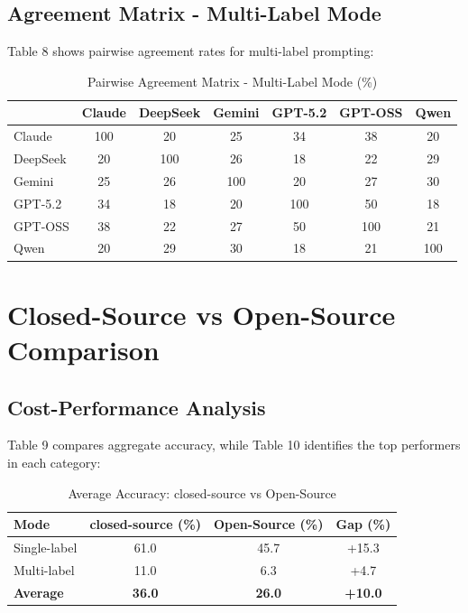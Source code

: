 \documentclass[12pt,a4paper]{article}
\begin{document}
\subsection{Agreement Matrix - Multi-Label Mode}

Table 8 shows pairwise agreement rates for multi-label prompting:

\begin{table}[H]
\centering
\begin{tabular}{lcccccc}
\toprule
 & \textbf{Claude} & \textbf{DeepSeek} & \textbf{Gemini} & \textbf{GPT-5.2} & \textbf{GPT-OSS} & \textbf{Qwen} \\
\midrule
Claude & 100 & 20 & 25 & 34 & 38 & 20 \\
DeepSeek & 20 & 100 & 26 & 18 & 22 & 29 \\
Gemini & 25 & 26 & 100 & 20 & 27 & 30 \\
GPT-5.2 & 34 & 18 & 20 & 100 & 50 & 18 \\
GPT-OSS & 38 & 22 & 27 & 50 & 100 & 21 \\
Qwen & 20 & 29 & 30 & 18 & 21 & 100 \\
\bottomrule
\end{tabular}
\caption{Pairwise Agreement Matrix - Multi-Label Mode (\%)}
\end{table}

\newpage

\section{Closed-Source vs Open-Source Comparison}

\subsection{Cost-Performance Analysis}

Table 9 compares aggregate accuracy, while Table 10 identifies the top performers in each category:

\begin{table}[H]
\centering
\begin{tabular}{lccc}
\toprule
\textbf{Mode} & \textbf{closed-source (\%)} & \textbf{Open-Source (\%)} & \textbf{Gap (\%)} \\
\midrule
Single-label & 61.0 & 45.7 & +15.3 \\
Multi-label & 11.0 & 6.3 & +4.7 \\
\midrule
\textbf{Average} & \textbf{36.0} & \textbf{26.0} & \textbf{+10.0} \\
\bottomrule
\end{tabular}
\caption{Average Accuracy: closed-source vs Open-Source}
\end{table}
\end{document}

